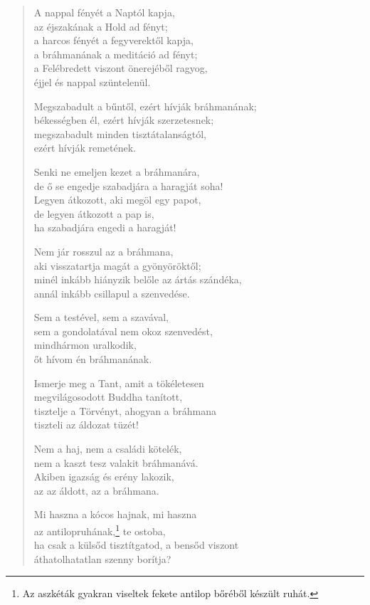 \begin{verse}
 A nappal fényét a Naptól kapja,\\
az éjszakának a Hold ad fényt;\\
a harcos fényét a fegyverektől kapja,\\
a bráhmanának a meditáció ad fényt;\\
a Felébredett viszont önerejéből ragyog,\\
éjjel és nappal szüntelenül.

 Megszabadult a bűntől, ezért hívják bráhmanának;\\
békességben él, ezért hívják szerzetesnek;\\
megszabadult minden tisztátalanságtól,\\
ezért hívják remetének.

 Senki ne emeljen kezet a bráhmanára,\\
de ő se engedje szabadjára a haragját soha!\\
Legyen átkozott, aki megöl egy papot,\\
de legyen átkozott a pap is,\\
ha szabadjára engedi a haragját!

 Nem jár rosszul az a bráhmana,\\
aki visszatartja magát a gyönyöröktől;\\
minél inkább hiányzik belőle az ártás szándéka,\\
annál inkább csillapul a szenvedése.

 Sem a testével, sem a szavával,\\
sem a gondolatával nem okoz szenvedést,\\
mindhármon uralkodik,\\
őt hívom én bráhmanának.

 Ismerje meg a Tant, amit a tökéletesen\\
megvilágosodott Buddha tanított,\\
tisztelje a Törvényt, ahogyan a bráhmana\\
tiszteli az áldozat tüzét!

 Nem a haj, nem a családi kötelék,\\
nem a kaszt tesz valakit bráhmanává.\\
Akiben igazság és erény lakozik,\\
az az áldott, az a bráhmana.

 Mi haszna a kócos hajnak, mi haszna\\
az antilopruhának,\footnote{Az aszkéták gyakran viseltek fekete antilop bőréből készült ruhát.} te ostoba,\\
ha csak a külsőd tisztítgatod, a bensőd viszont\\
áthatolhatatlan szenny borítja?


\end{verse}
